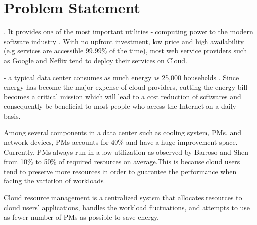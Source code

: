 \section{Problem Statement}


. It provides one of the most important utilities - computing power to the modern software industry \cite{2010arXiv1006.0308B}. With no upfront investment, low price and high availability (e.g services are accessible 99.99\% of the time), most web service providers such as Google and Neflix tend to deploy their services on Cloud. 

 - a typical data center consumes as much energy as 25,000 households \cite{Dayarathna:2016ua}. Since energy has become the major expense of cloud providers, cutting the energy bill becomes a critical mission which will lead to a cost reduction of softwares and consequently be beneficial to most people who access the Internet on a daily basis.

 Among several components in a data center such as cooling system, PMs, and network devices, PMs accounts for 40\% and have a huge improvement space. Currently, PMs always run in a low utilization as observed by Barroso and Shen \cite{Barroso:2007jt, Shen:2015hm} - from 10\% to 50\% of required resources on average.This is because cloud users tend to preserve more resources in order to guarantee the performance when facing the variation of workloads.

 Cloud resource management is a centralized system \cite{} that allocates resources to cloud users' applications, handles the workload fluctuations, and attempts to use as fewer number of PMs as possible to save energy. 

